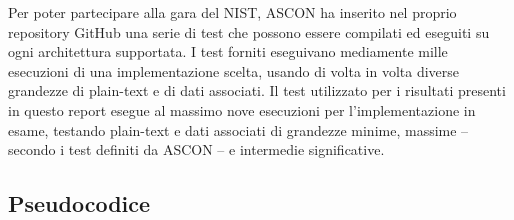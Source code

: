 \documentclass[12pt,a4paper,italian]{report}
\begin{document}
Per poter partecipare alla gara del NIST, ASCON ha inserito nel proprio repository GitHub una serie di test che possono essere compilati ed eseguiti su ogni architettura supportata. I test forniti eseguivano mediamente mille esecuzioni di una implementazione scelta, usando di volta in volta diverse grandezze di plain-text e di dati associati. Il test utilizzato per i risultati presenti in questo report esegue al massimo nove esecuzioni per l'implementazione in esame, testando plain-text e dati associati di grandezze minime, massime – secondo i test definiti da ASCON – e intermedie significative.

\subsection{Pseudocodice}
\end{document}
